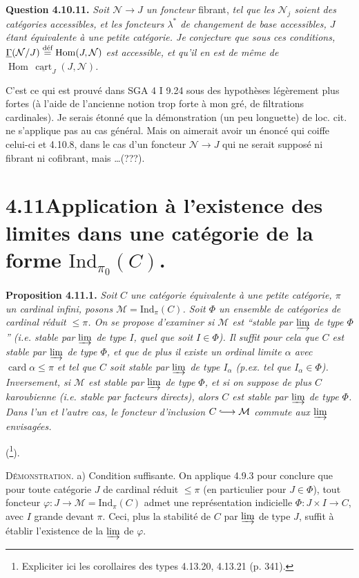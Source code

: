 \documentclass[11pt]{article}
\newcommand{\printedpage}[1]{\marginpar{\footnotesize p.~#1}}
\newcommand{\msp}[1]{\marginpar{\footnotesize [#1]}}
\newcommand{\Ind}{\mathrm{Ind}}
\newcommand{\uGamma}{\underline{\Gamma}}
\newcommand{\Hom}{\operatorname{Hom}}
\newcommand{\defeq}{\overset{\text{\upshape déf}}{=}}
\newcommand{\into}{\lhook\joinrel\longrightarrow}
\begin{document}
\textbf{Question 4.10.11.} \textit{Soit $\mathcal{N} \longrightarrow J$ un foncteur} fibrant, \textit{tel que les $\mathcal{N}_j$ soient des catégories accessibles, et les foncteurs $\lambda^*$ de changement de base accessibles, $J$ étant équivalente à une petite catégorie. Je} \msp{page 267} \textit{conjecture que sous ces conditions, $\uGamma(\mathcal{N}/J) \defeq \Hom(J,\mathcal{N})$ est accessible, et qu'il en est de même de $\Hom\,\underline{\operatorname{cart}}_J(J,\mathcal{N})$.}

C'est ce qui est prouvé dans SGA 4 I 9.24 sous des hypothèses légèrement plus fortes (à l'aide de l'ancienne notion trop forte à mon gré, de filtrations cardinales). Je serais étonné que la démonstration (un peu longuette) de loc. cit. ne s'applique pas au cas général. Mais on aimerait avoir un énoncé qui coiffe celui-ci et 4.10.8, dans le cas d'un foncteur $\mathcal{N} \longrightarrow J$ qui ne serait supposé ni fibrant ni cofibrant, mais \ldots(???).

\section*{4.11\quad Application à l'existence des limites dans une catégorie de la forme $\Ind_{\pi_0}(C)$.}

\textbf{Proposition 4.11.1.} \textit{Soit} \msp{page 268} \textit{$C$ une catégorie équivalente à une petite catégorie, $\pi$ un cardinal infini, posons $\mathcal{M} = \Ind_\pi(C)$. Soit $\Phi$ un ensemble de catégories de cardinal réduit $\leqslant \pi$. On se propose d'examiner si $\mathcal{M}$ est “stable par $\varinjlim$ de type $\Phi$” (i.e. stable par $\varinjlim$ de type $I$, quel que soit $I \in \Phi$). Il suffit pour cela que $C$ est stable par $\varinjlim$ de type $\Phi$, et que de plus il existe un ordinal limite $\alpha$ avec $\operatorname{card}\alpha \leqslant \pi$ et tel que $C$ soit stable par $\varinjlim$ de type $I_\alpha$ (p.ex. tel que $I_\alpha \in \Phi$). Inversement, si $\mathcal{M}$ est stable par $\varinjlim$ de type $\Phi$, et si on suppose de plus $C$ karoubienne (i.e. stable par facteurs directs), alors $C$ est stable par $\varinjlim$ de type $\Phi$. Dans l'un et l'autre cas, le foncteur d'inclusion $C \into \mathcal{M}$ commute aux $\varinjlim$ envisagées.}

(\footnote{Expliciter ici les corollaires des types 4.13.20, 4.13.21 (p. 341).}).

\textsc{Démonstration}. a) Condition suffisante. On applique 4.9.3 pour conclure que
\printedpage{101}
\msp{page 269}
pour toute catégorie $J$ de cardinal réduit $\leqslant \pi$ (en particulier pour $J \in \Phi$), tout foncteur $\varphi : J \longrightarrow \mathcal{M} = \Ind_\pi(C)$ admet une représentation indicielle $\Phi : J \times I \longrightarrow C$, avec $I$ grande devant $\pi$. Ceci, plus la stabilité de $C$ par $\varinjlim$ de type $J$, suffit à établir l'existence de la $\varinjlim$ de $\varphi$.
\end{document}
